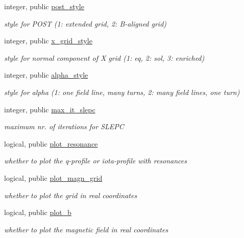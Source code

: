 \begin{DoxyCompactItemize}
integer, public \hyperlink{namespacenum__vars_a08dbb9f56d96f37c61cacb9d23d6e17f}{post\+\_\+style}
\begin{DoxyCompactList}\small\item\em style for P\+O\+ST (1\+: extended grid, 2\+: B-\/aligned grid) \end{DoxyCompactList}\item 
integer, public \hyperlink{namespacenum__vars_a72c4ea80e13135b4c314f3f9d3bfdc81}{x\+\_\+grid\+\_\+style}
\begin{DoxyCompactList}\small\item\em style for normal component of X grid (1\+: eq, 2\+: sol, 3\+: enriched) \end{DoxyCompactList}\item 
integer, public \hyperlink{namespacenum__vars_aa3b575dadc3dc227a57d52b118408d62}{alpha\+\_\+style}
\begin{DoxyCompactList}\small\item\em style for alpha (1\+: one field line, many turns, 2\+: many field lines, one turn) \end{DoxyCompactList}\item 
integer, public \hyperlink{namespacenum__vars_a8855ce3cc66743410c56c1dfecbc6a1a}{max\+\_\+it\+\_\+slepc}
\begin{DoxyCompactList}\small\item\em maximum nr. of iterations for S\+L\+E\+PC \end{DoxyCompactList}\item 
logical, public \hyperlink{namespacenum__vars_a70fd85a310da008203347f25b0043238}{plot\+\_\+resonance}
\begin{DoxyCompactList}\small\item\em whether to plot the q-\/profile or iota-\/profile with resonances \end{DoxyCompactList}\item 
logical, public \hyperlink{namespacenum__vars_ad6bbee854ff7479d1d2ded83cda04699}{plot\+\_\+magn\+\_\+grid}
\begin{DoxyCompactList}\small\item\em whether to plot the grid in real coordinates \end{DoxyCompactList}\item 
logical, public \hyperlink{namespacenum__vars_a09ac710a02758a271706d96e50e5c1b1}{plot\+\_\+b}
\begin{DoxyCompactList}\small\item\em whether to plot the magnetic field in real coordinates \end{DoxyCompactList}\item 

\end{DoxyCompactItemize}
